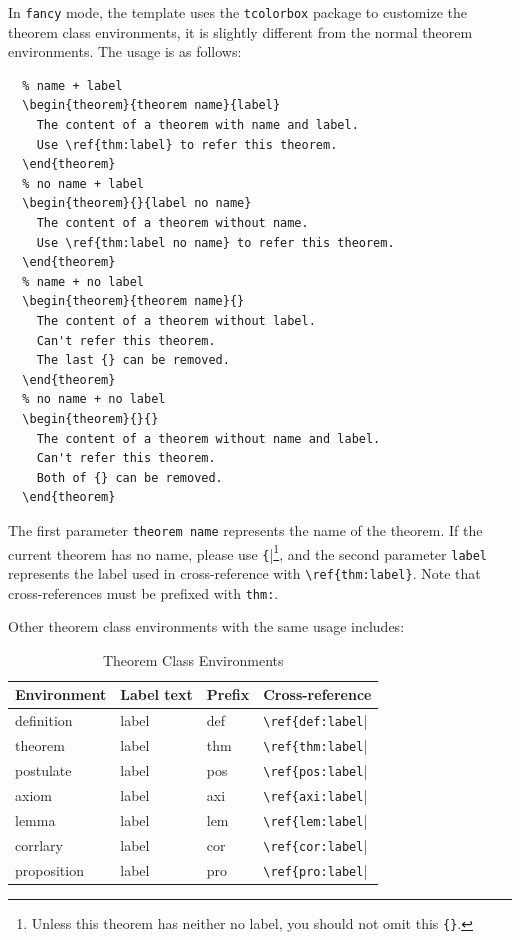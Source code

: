 \documentclass[11pt]{boyogalaelegantbook}
\begin{document}
In \lstinline{fancy} mode, the template uses the \lstinline{tcolorbox} package to customize the theorem class environments, it is slightly different from the normal theorem environments. The usage is as follows:
\begin{lstlisting}
  % name + label
  \begin{theorem}{theorem name}{label}
    The content of a theorem with name and label. 
    Use \ref{thm:label} to refer this theorem.
  \end{theorem}
  % no name + label
  \begin{theorem}{}{label no name}
    The content of a theorem without name.
    Use \ref{thm:label no name} to refer this theorem.
  \end{theorem}
  % name + no label
  \begin{theorem}{theorem name}{}
    The content of a theorem without label.
    Can't refer this theorem.
    The last {} can be removed.
  \end{theorem}
  % no name + no label
  \begin{theorem}{}{}
    The content of a theorem without name and label.
    Can't refer this theorem.
    Both of {} can be removed.
  \end{theorem}
  \end{lstlisting}

The first parameter \lstinline{theorem name} represents the name of the theorem. If the current theorem has no name, please use \lstinline|{||\cprotect\footnote{Unless this theorem has neither no label, you should not omit this \verb|{}|.}, and the second parameter \lstinline{label} represents the label used in cross-reference with \verb|\ref{thm:label}|. Note that cross-references must be prefixed with \lstinline{thm:}. 

Other theorem class environments with the same usage includes:

\begin{table}[htbp]
\centering
\caption{Theorem Class Environments}
  \begin{tabular}{llll}
  \toprule
  Environment & Label text & Prefix & Cross-reference \\
  \midrule
  definition & label & def   & \lstinline|\ref{def:label|| \\
  theorem & label & thm   & \lstinline|\ref{thm:label|| \\
  postulate & label & pos & \lstinline|\ref{pos:label|| \\
  axiom & label & axi & \lstinline|\ref{axi:label||\\
  lemma & label & lem   & \lstinline|\ref{lem:label|| \\
  corrlary & label & cor   & \lstinline|\ref{cor:label|| \\
  proposition & label & pro   & \lstinline|\ref{pro:label|| \\
  \bottomrule
  \end{tabular}%
\label{tab:theorem-class}%
\end{table}%
\end{document}

